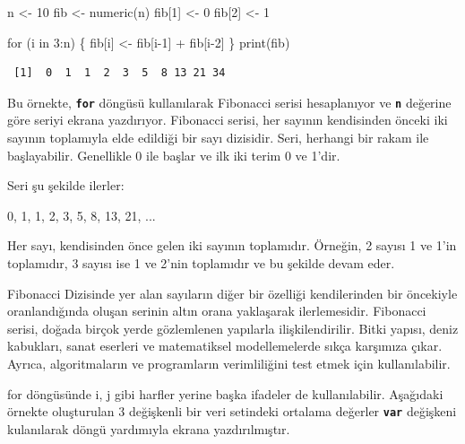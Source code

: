 \documentclass[
  letterpaper,
  DIV=11,
  numbers=noendperiod]{scrreprt}
\newenvironment{Shaded}{\begin{snugshade}}{\end{snugshade}}
\newcommand{\ControlFlowTok}[1]{\textcolor[rgb]{0.00,0.23,0.31}{#1}}
\newcommand{\DecValTok}[1]{\textcolor[rgb]{0.68,0.00,0.00}{#1}}
\newcommand{\FunctionTok}[1]{\textcolor[rgb]{0.28,0.35,0.67}{#1}}
\newcommand{\NormalTok}[1]{\textcolor[rgb]{0.00,0.23,0.31}{#1}}
\newcommand{\OtherTok}[1]{\textcolor[rgb]{0.00,0.23,0.31}{#1}}
\newcommand{\SpecialCharTok}[1]{\textcolor[rgb]{0.37,0.37,0.37}{#1}}
\begin{document}
\begin{Shaded}
\begin{Highlighting}[]
\NormalTok{n }\OtherTok{\textless{}{-}} \DecValTok{10}
\NormalTok{fib }\OtherTok{\textless{}{-}} \FunctionTok{numeric}\NormalTok{(n)}
\NormalTok{fib[}\DecValTok{1}\NormalTok{] }\OtherTok{\textless{}{-}} \DecValTok{0}
\NormalTok{fib[}\DecValTok{2}\NormalTok{] }\OtherTok{\textless{}{-}} \DecValTok{1}

\ControlFlowTok{for}\NormalTok{ (i }\ControlFlowTok{in} \DecValTok{3}\SpecialCharTok{:}\NormalTok{n) \{}
\NormalTok{  fib[i] }\OtherTok{\textless{}{-}}\NormalTok{ fib[i}\DecValTok{{-}1}\NormalTok{] }\SpecialCharTok{+}\NormalTok{ fib[i}\DecValTok{{-}2}\NormalTok{]}
\NormalTok{\}}
\FunctionTok{print}\NormalTok{(fib)}
\end{Highlighting}
\end{Shaded}

\begin{verbatim}
 [1]  0  1  1  2  3  5  8 13 21 34
\end{verbatim}

Bu örnekte, \textbf{\texttt{for}} döngüsü kullanılarak Fibonacci serisi
hesaplanıyor ve \textbf{\texttt{n}} değerine göre seriyi ekrana
yazdırıyor. Fibonacci serisi, her sayının kendisinden önceki iki sayının
toplamıyla elde edildiği bir sayı dizisidir. Seri, herhangi bir rakam
ile başlayabilir. Genellikle 0 ile başlar ve ilk iki terim 0 ve 1'dir.

Seri şu şekilde ilerler:

0, 1, 1, 2, 3, 5, 8, 13, 21, ...

Her sayı, kendisinden önce gelen iki sayının toplamıdır. Örneğin, 2
sayısı 1 ve 1'in toplamıdır, 3 sayısı ise 1 ve 2'nin toplamıdır ve bu
şekilde devam eder.

Fibonacci Dizisinde yer alan sayıların diğer bir özelliği kendilerinden
bir öncekiyle oranlandığında oluşan serinin altın orana yaklaşarak
ilerlemesidir. Fibonacci serisi, doğada birçok yerde gözlemlenen
yapılarla ilişkilendirilir. Bitki yapısı, deniz kabukları, sanat
eserleri ve matematiksel modellemelerde sıkça karşımıza çıkar. Ayrıca,
algoritmaların ve programların verimliliğini test etmek için
kullanılabilir.

for döngüsünde i, j gibi harfler yerine başka ifadeler de
kullanılabilir. Aşağıdaki örnekte oluşturulan 3 değişkenli bir veri
setindeki ortalama değerler \textbf{\texttt{var}} değişkeni kulanılarak
döngü yardımıyla ekrana yazdırılmıştır.
\end{document}
